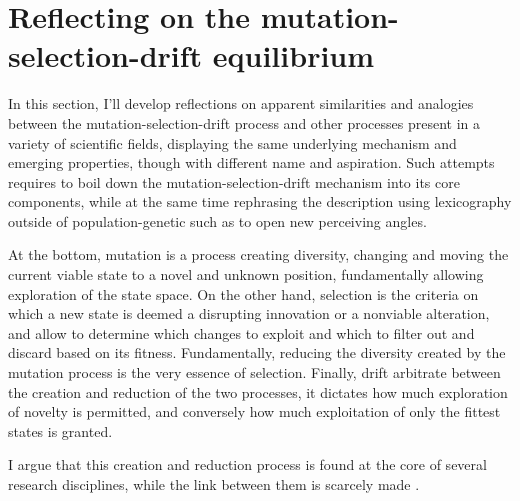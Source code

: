 \section{Reflecting on the mutation-selection-drift equilibrium}
In this section, I'll develop reflections on apparent similarities and analogies between the mutation-selection-drift process and other processes present in a variety of scientific fields, displaying the same underlying mechanism and emerging properties, though with different name and aspiration.
Such attempts requires to boil down the mutation-selection-drift mechanism into its core components, while at the same time rephrasing the description using lexicography outside of population-genetic such as to open new perceiving angles.

At the bottom, mutation is a process creating diversity, changing and moving the current viable state to a novel and unknown position, fundamentally allowing exploration of the state space.
On the other hand, selection is the criteria on which a new state is deemed a disrupting innovation or a nonviable alteration, and allow to determine which changes to exploit and which to filter out and discard based on its fitness.
Fundamentally, reducing the diversity created by the mutation process is the very essence of selection.
Finally, drift arbitrate between the creation and reduction of the two processes, it dictates how much exploration of novelty is permitted, and conversely how much exploitation of only the fittest states is granted.

I argue that this creation and reduction process is found at the core of several research disciplines, while the link between them is scarcely made \cite{Baeck1994, Eiben1998}. 

